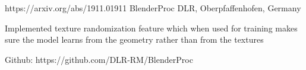 
\begin{cventries}
  \cventry
    {https://arxiv.org/abs/1911.01911} %
    {BlenderProc} %
    {DLR, Oberpfaffenhofen, Germany} %
    {} %
    {
      \begin{cvitems} %
        \item {Implemented texture randomization feature which when used for training makes sure the model learns from the geometry rather than from the textures}
        \item {Github: https://github.com/DLR-RM/BlenderProc}
      \end{cvitems}
    }
\end{cventries}
